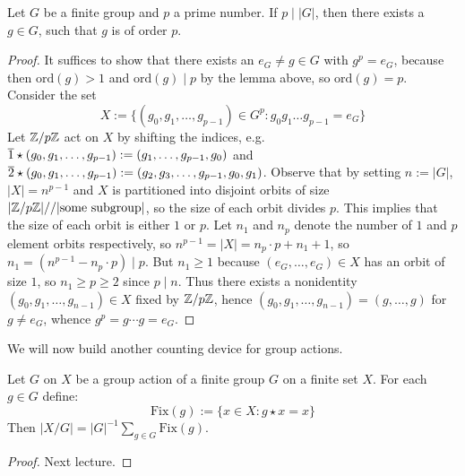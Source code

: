\begin{thmbox}
    Let $G$ be a finite group and $p$ a prime number. If $p \mid |G|$, then there exists a $g \in G$, such that $g$ is of order $p$.
\end{thmbox}
\begin{proof}
    It suffices to show that there exists an $e_G \neq g \in G$ with $g^p = e_G$, because then $\text{ord}(g) > 1$ and $\text{ord}(g) \mid p$  by the lemma above, so $\text{ord}(g) = p$. Consider the set 
    \[ X := \{(g_0, g_1, \dots, g_{p-1}) \in G^p : g_0g_1\dots g_{p-1} = e_G\} \]
    Let $\mathbb{Z}/p\mathbb{Z}$ act on $X$ by shifting the indices, e.g. $\overline{1} \star (g_0, g_1, \dots, g_{p-1}) := (g_1,\dots, g_{p-1}, g_0)$ and $\overline{2} \star (g_0, g_1, \dots, g_{p-1}) := (g_2,g_3, \dots, g_{p-1}, g_0, g_1)$. Observe that by setting $n := |G|$, $|X| = n^{p-1}$ and $X$ is partitioned into disjoint orbits of size $|\mathbb{Z}/p\mathbb{Z}| //|\text{some subgroup}|$, so the size of each orbit divides $p$. This implies that the size of each orbit is either $1$ or $p$. Let $n_1$ and $n_p$ denote the number of $1$ and $p$ element orbits respectively, so $n^{p-1} = |X| = n_p \cdot p + n_1 + 1$, so $n_1 = (n^{p-1} - n_p \cdot p) \mid p$. But $n_1 \geq 1$ because $(e_G, \dots, e_G) \in X$ has an orbit of size $1$, so $n_1 \geq p \geq 2$ since $p \mid n$. Thus there exists a nonidentity $(g_0, g_1, \dots, g_{n-1}) \in X$ fixed by $\mathbb{Z}/p\mathbb{Z}$, hence $(g_0, g_1, \dots, g_{n-1}) = (g, \dots, g)$ for $g \neq e_G$, whence $g^p = g\cdots g = e_G$. 
\end{proof}

We will now build another counting device for group actions.

\begin{thmbox}
    Let $G$ on $X$ be a group action of a finite group $G$ on a finite set $X$. For each $g \in G$ define:
    \[ \text{Fix}(g) := \{x \in X : g \star x = x\} \]
    Then $|X/G| = |G|^{-1}\sum_{g \in G}\text{Fix}(g)$. 
\end{thmbox}
\begin{proof}
    Next lecture. 
\end{proof}
